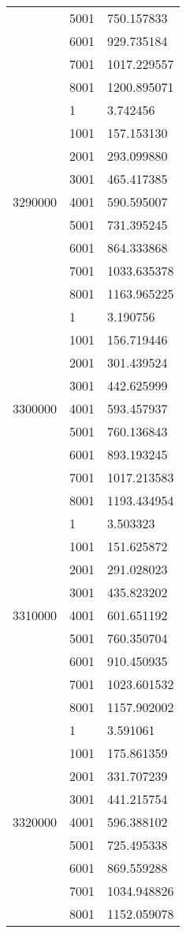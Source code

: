 \begin{table}[htb!]
\begin{tabular}{lll}
 & 5001 & 750.157833 \\
 & 6001 & 929.735184 \\
 & 7001 & 1017.229557 \\
 & 8001 & 1200.895071 \\
\multirow[c]{9}{*}{3290000} & 1 & 3.742456 \\
 & 1001 & 157.153130 \\
 & 2001 & 293.099880 \\
 & 3001 & 465.417385 \\
 & 4001 & 590.595007 \\
 & 5001 & 731.395245 \\
 & 6001 & 864.333868 \\
 & 7001 & 1033.635378 \\
 & 8001 & 1163.965225 \\
\multirow[c]{9}{*}{3300000} & 1 & 3.190756 \\
 & 1001 & 156.719446 \\
 & 2001 & 301.439524 \\
 & 3001 & 442.625999 \\
 & 4001 & 593.457937 \\
 & 5001 & 760.136843 \\
 & 6001 & 893.193245 \\
 & 7001 & 1017.213583 \\
 & 8001 & 1193.434954 \\
\multirow[c]{9}{*}{3310000} & 1 & 3.503323 \\
 & 1001 & 151.625872 \\
 & 2001 & 291.028023 \\
 & 3001 & 435.823202 \\
 & 4001 & 601.651192 \\
 & 5001 & 760.350704 \\
 & 6001 & 910.450935 \\
 & 7001 & 1023.601532 \\
 & 8001 & 1157.902002 \\
\multirow[c]{9}{*}{3320000} & 1 & 3.591061 \\
 & 1001 & 175.861359 \\
 & 2001 & 331.707239 \\
 & 3001 & 441.215754 \\
 & 4001 & 596.388102 \\
 & 5001 & 725.495338 \\
 & 6001 & 869.559288 \\
 & 7001 & 1034.948826 \\
 & 8001 & 1152.059078 \\

\end{tabular}
\end{table}
